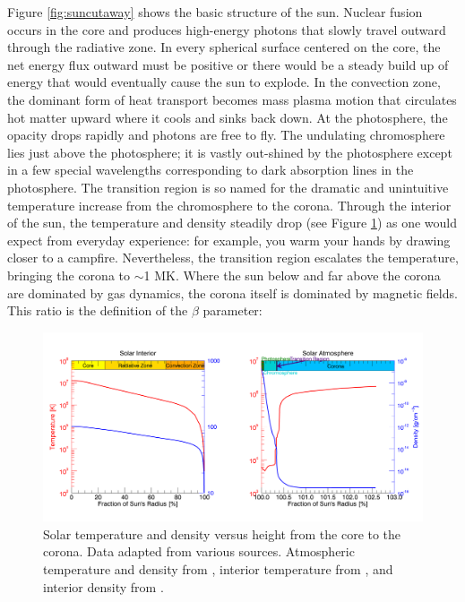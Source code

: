 Figure \ref{fig:suncutaway} shows the basic structure of the sun. Nuclear fusion occurs in the core and produces high-energy photons that slowly travel outward through the radiative zone. In every spherical surface centered on the core, the net energy flux outward must be positive or there would be a steady build up of energy that would eventually cause the sun to explode. In the convection zone, the dominant form of heat transport becomes mass plasma motion that circulates hot matter upward where it cools and sinks back down. At the photosphere, the opacity drops rapidly and photons are free to fly. The undulating chromosphere lies just above the photosphere; it is vastly out-shined by the photosphere except in a few special wavelengths corresponding to dark absorption lines in the photosphere. The transition region is so named for the dramatic and unintuitive temperature increase from the chromosphere to the corona. Through the interior of the sun, the temperature and density steadily drop (see Figure \ref{fig:suntemperaturedensity}) as one would expect from everyday experience: for example, you warm your hands by drawing closer to a campfire. Nevertheless, the transition region escalates the temperature, bringing the corona to $\sim$1 MK. Where the sun below and far above the corona are dominated by gas dynamics, the corona itself is dominated by magnetic fields. This ratio is the definition of the $\beta$ parameter:

\begin{figure}[!h]
    \begin{center}
	    \includegraphics[width=\textwidth]{Images/SolarTemperatureAndDensity.png}
    \end{center}
    \caption[Solar Temperature and Density Versus Height]{
        Solar temperature and density versus height from the core to the corona. Data adapted
        from various sources. Atmospheric temperature and density from \citet{Eddy1979}, 
        interior temperature from \citet{Lang2001}, and interior density from  
        \citet{Christensen-Dalsgaard1996}.         
    }
    \label{fig:suntemperaturedensity}
\end{figure}

